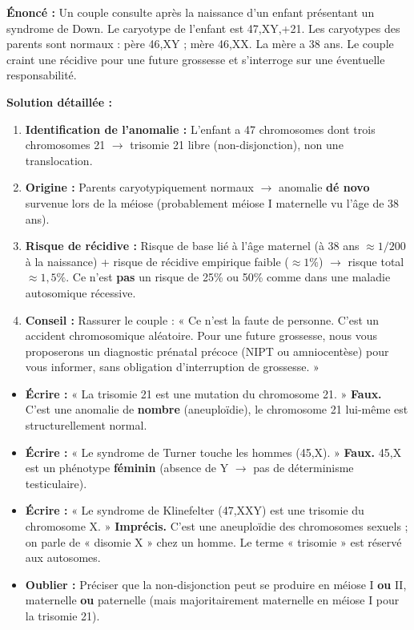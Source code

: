 \documentclass[11pt]{article}
\begin{document}
\begin{exoresolu}
\textbf{Énoncé :} Un couple consulte après la naissance d'un enfant présentant un syndrome de Down. Le caryotype de l'enfant est 47,XY,+21. Les caryotypes des parents sont normaux : père 46,XY ; mère 46,XX. La mère a 38 ans. Le couple craint une récidive pour une future grossesse et s'interroge sur une éventuelle responsabilité.\par
\tcblower
\textbf{Solution détaillée :}
\begin{enumerate}
\item \textbf{Identification de l'anomalie :} L'enfant a 47 chromosomes dont trois chromosomes 21 $\rightarrow$ trisomie 21 libre (non-disjonction), non une translocation.
\item \textbf{Origine :} Parents caryotypiquement normaux $\rightarrow$ anomalie \textbf{dé novo} survenue lors de la méiose (probablement méiose I maternelle vu l'âge de 38 ans).
\item \textbf{Risque de récidive :} Risque de base lié à l'âge maternel (à 38 ans $\approx 1/200$ à la naissance) + risque de récidive empirique faible ($\approx 1\%$) $\rightarrow$ risque total $\approx 1,5\%$. Ce n'est \textbf{pas} un risque de 25\% ou 50\% comme dans une maladie autosomique récessive.
\item \textbf{Conseil :} Rassurer le couple : « Ce n'est la faute de personne. C'est un accident chromosomique aléatoire. Pour une future grossesse, nous vous proposerons un diagnostic prénatal précoce (NIPT ou amniocentèse) pour vous informer, sans obligation d'interruption de grossesse. »
\end{enumerate}
\end{exoresolu}

\begin{attention}
\begin{itemize}
\item \textbf{Écrire :} « La trisomie 21 est une mutation du chromosome 21. » \textbf{Faux.} C'est une anomalie de \textbf{nombre} (aneuploïdie), le chromosome 21 lui-même est structurellement normal.
\item \textbf{Écrire :} « Le syndrome de Turner touche les hommes (45,X). » \textbf{Faux.} 45,X est un phénotype \textbf{féminin} (absence de Y $\rightarrow$ pas de déterminisme testiculaire).
\item \textbf{Écrire :} « Le syndrome de Klinefelter (47,XXY) est une trisomie du chromosome X. » \textbf{Imprécis.} C'est une aneuploïdie des chromosomes sexuels ; on parle de « disomie X » chez un homme. Le terme « trisomie » est réservé aux autosomes.
\item \textbf{Oublier :} Préciser que la non-disjonction peut se produire en méiose I \textbf{ou} II, maternelle \textbf{ou} paternelle (mais majoritairement maternelle en méiose I pour la trisomie 21).
\end{itemize}
\end{attention}
\end{document}
